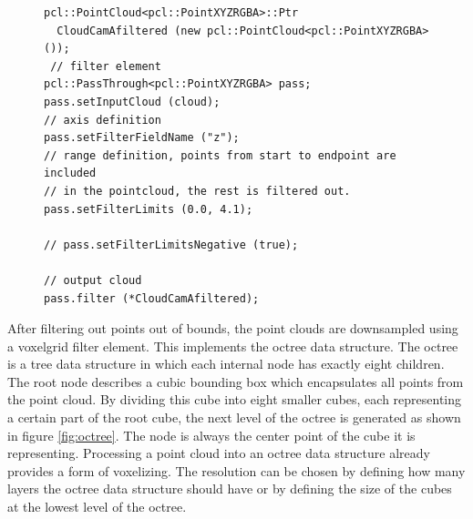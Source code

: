 \begin{figure}[H]
\begin{lstlisting}[frame = single, caption={Passthrough filter for the camera input, to remove data which is out of bounds.}, captionpos=b, label={lst:passfilter}]  
pcl::PointCloud<pcl::PointXYZRGBA>::Ptr 
  CloudCamAfiltered (new pcl::PointCloud<pcl::PointXYZRGBA> ()); 
 // filter element
pcl::PassThrough<pcl::PointXYZRGBA> pass; 
pass.setInputCloud (cloud);
// axis definition
pass.setFilterFieldName ("z");	
// range definition, points from start to endpoint are included	
// in the pointcloud, the rest is filtered out.
pass.setFilterLimits (0.0, 4.1);

// pass.setFilterLimitsNegative (true);

// output cloud
pass.filter (*CloudCamAfiltered); 	
\end{lstlisting}
\end{figure}
After filtering out points out of bounds, the point clouds are downsampled using a voxelgrid filter element. This implements the octree data structure. The octree is a tree data structure in which each internal node has exactly eight children. The root node describes a cubic bounding box which encapsulates all points from the point cloud. By dividing this cube into eight smaller cubes, each representing a certain part of the root cube, the next level of the octree is generated as shown in figure \ref{fig:octree}. The node is always the center point of the cube it is representing. Processing a point cloud into an octree data structure already provides a form of voxelizing. The resolution can be chosen by defining how many layers the octree data structure should have or by defining the size of the cubes at the lowest level of the octree. 

